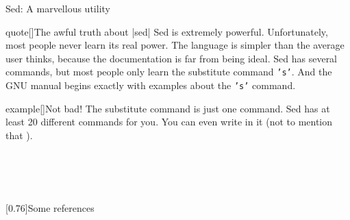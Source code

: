 
\makeatletter
{}
\makeatother
\begin{frame}{Sed: A marvellous utility}
    \vspace{-2mm}
    \begin{varblock}{quote}[\textwidth]{The awful truth about \bash|sed|}
        \textnormal{Sed is extremely powerful.
        Unfortunately, most people never learn its real power.
        The language is simpler than the average user thinks, because the documentation is far from being ideal.
        Sed has several commands, but most people only learn the substitute command \texttt{'s'}.
        And the GNU manual begins exactly with examples about the \texttt{'s'} command.}
    \end{varblock}
    \vspace{-1mm}
    \PrepareURLsymbol[PB]
    \begin{varblock}{example}[\textwidth]{Not bad!}
        The substitute command is just one command.
        Sed has at least 20 different commands for you.
        You can even write  in it (not to mention that ).
    \end{varblock}
    \vspace{-1mm}
    \begin{lrbox}{\tmpbox}
        \begin{minipage}{0.75\textwidth}
             \\
             \\
            \\
        \end{minipage}
    \end{lrbox}
    \begin{varblock*}{}[0.76\textwidth]{Some references}
        \usebox{\tmpbox}
    \end{varblock*}
\end{frame}
